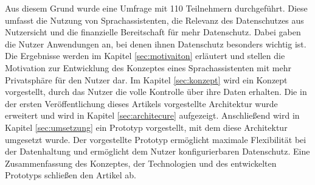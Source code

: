 Aus diesem Grund wurde eine Umfrage mit 110 Teilnehmern durchgeführt. Diese umfasst die Nutzung von Sprachassistenten, die Relevanz des Datenschutzes aus Nutzersicht und  die finanzielle Bereitschaft für mehr Datenschutz. Dabei gaben die Nutzer Anwendungen an, bei denen ihnen Datenschutz besonders wichtig ist. Die Ergebnisse werden im Kapitel \ref{sec:motivaiton} erläutert und stellen die Motivation zur Entwicklung des Konzeptes eines Sprachassistenten mit mehr Privatsphäre für den Nutzer dar. Im Kapitel \ref{sec:konzept} wird ein Konzept vorgestellt, durch das Nutzer die volle Kontrolle über ihre Daten erhalten. Die in der ersten Veröffentlichung dieses Artikels vorgestellte Architektur wurde erweitert und wird in Kapitel \ref{sec:architecure} aufgezeigt.
Anschließend wird in Kapitel \ref{sec:umsetzung} ein Prototyp vorgestellt, mit dem diese Architektur umgesetzt wurde. Der vorgestellte Prototyp ermöglicht maximale Flexibilität bei der Datenhaltung und ermöglicht dem Nutzer konfigurierbaren Datenschutz. Eine Zusammenfassung des Konzeptes, der Technologien und des entwickelten Prototyps schließen den Artikel ab. \newline